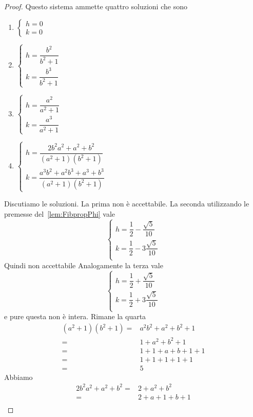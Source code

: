 \begin{proof}
Questo sistema ammette quattro soluzioni che sono
\begin{enumerate}
	\item $\left\{
	\begin{array}{l}
		h=0\\
		k=0
	\end{array}
	\right.$
	\item $\left\{
	\begin{array}{l}
		h=\dfrac{b^2}{b^2+1}\\
		k=\dfrac{b^3}{b^2+1}
	\end{array}
	\right.$
	\item $\left\{
	\begin{array}{l}
		h=\dfrac{a^2}{a^2+1}\\
		k=\dfrac{a^3}{a^2+1}
	\end{array}
	\right.$
	\item $\left\{
	\begin{array}{l}
		h=\dfrac{2b^2a^2+a^2+b^2}{(a^2+1)(b^2+1)}\\
		k=\dfrac{a^3b^2+a^2b^3+a^3+b^3}{(a^2+1)(b^2+1)}
	\end{array}
	\right.$
\end{enumerate}
Discutiamo le soluzioni. La prima non è accettabile. La seconda utilizzando  le premesse del~\vref{lem:FibpropPhi} vale	
\[\left\{
\begin{array}{l}
	h=\dfrac{1}{2}-\dfrac{\sqrt{5}}{10}\\
	k=\dfrac{1}{2}-3\dfrac{\sqrt{5}}{10}\\
\end{array}
\right.\]
Quindi non accettabile
Analogamente la terza vale \[\left\{
\begin{array}{l}
	h=\dfrac{1}{2}+\dfrac{\sqrt{5}}{10}\\
	k=\dfrac{1}{2}+3\dfrac{\sqrt{5}}{10}\\
\end{array}
\right.\]
e pure questa non è intera. Rimane la quarta
\begin{align*}
	(a^2+1)(b^2+1)={}&a^2b^2+a^2+b^2+1\\
	={}&1+a^2+b^2+1\\
	={}&1+1+a+b+1+1\\
	={}&1+1+1+1+1\\
	={}&5
\end{align*}
Abbiamo
\begin{align*}
	2b^2a^2+a^2+b^2={}&2+a^2+b^2\\
	={}&2+a+1+b+1\\

\end{align*}
\end{proof}

